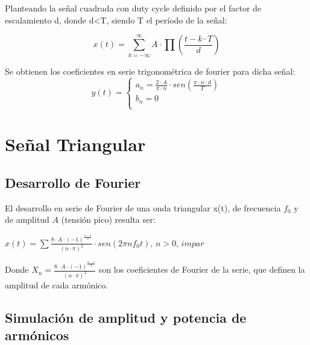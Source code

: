 \documentclass[../../labo_tp5_main.tex]{subfiles}
\begin{document}
Planteando la señal cuadrada con duty cycle definido por el factor de escalamiento d, donde d<T, siendo T el período de la señal:\par
\begin{center}
$$x(t) = \sum_{k = -\infty}^{\infty}A\cdot\prod(\frac{t-k\cdot T}{d})$$
\end{center}
Se obtienen los coeficientes en serie trigonométrica de fourier para dicha señal:
	 \begin{equation}
  	   y(t) = \left\{
	  	    \begin{array}{ll}
		 					a_n = \frac{2\cdot A}{\pi\cdot n}\cdot sen(\frac{\pi\cdot n\cdot d}{T}) \\
			 				b_n = 0 \\
	     	 \end{array}
	     	\right.
 	\end{equation}

\section{Señal Triangular}
\subsection{Desarrollo de Fourier}
El desarrollo en serie de Fourier de una onda triangular x(t), de frecuencia $f_0$ y de amplitud $A$ (tensión pico) resulta ser: \par
\begin{center}
$x(t) = \sum\frac{8\cdot A\cdot (-1)^\frac{n-1}{2}}{(n\cdot\pi)^2}\cdot sen(2\pi nf_{0}t),\,n>0,\,impar$
\end{center}
Donde $X_n = \frac{8\cdot A\cdot (-1)^\frac{n-1}{2}}{(n\cdot\pi)^2}$ son los coeficientes de Fourier de la serie, que definen la amplitud de cada armónico.\par

\subsection{Simulación de amplitud y potencia de armónicos}
\end{document}
